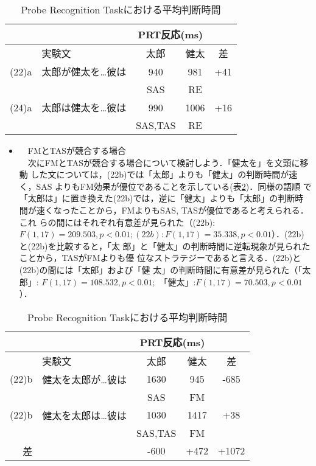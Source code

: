 \begin{table}
\begin{center}
\caption{Probe Recognition Taskにおける平均判断時間}
\label{table:ptr}
\begin{tabular}{|r|l|c|c|c|} \hline
    \multicolumn{2}{|c|}{} & \multicolumn{2}{c|}{PRT反応(ms)} &   \\ \hline
      & 実験文 & 太郎 & 健太 & 差 \\ \hline
(22)a & 太郎が健太を\ldots 彼は & 940 &  981	& +41 \\
      &                    & SAS & RE   & \\ \hline
(24)a & 太郎は健太を\ldots 彼は & 990 & 1006	& +16 \\
      &                    & SAS,TAS & RE & \\ \hline
\end{tabular}
\end{center}
\end{table}

\begin{itemize}
  \item　FMとTASが競合する場合\\
　次にFMとTASが競合する場合について検討しよう．「健太を」を文頭に移動
した文については，(22b)では「太郎」よりも「健太」の判断時間が速く，SAS
よりもFM効果が優位であることを示している(表\ref{table:fmtas})．同様の語順
で「太郎は」に置き換えた(22b)では，逆に「健太」よりも「太郎」の判断時
間が速くなったことから，FMよりもSAS, TASが優位であると考えられる．これ
らの間にはそれぞれ有意差が見られた（(22b): $F(1,17)=209.503,
p<0.01;(22b):F(1,17)=35.338,p<0.01$）．(22b)と(22b)を比較すると，「太
郎」と「健太」の判断時間に逆転現象が見られたことから，TASがFMよりも優
位なストラテジーであると言える．(22b)と(22b)の間には「太郎」および「健
太」の判断時間に有意差が見られた（「太郎」: $F(1,17)=108.532, p<0.01;$ 
「健太」:$F(1,17)=70.503,p<0.01$）．
\end{itemize}

\begin{table}
\vspace{-5mm}
\begin{center}
\caption{Probe Recognition Taskにおける平均判断時間}
\label{table:fmtas}
\begin{tabular}{|r|l|c|c|c|} \hline
    \multicolumn{2}{|c|}{} & \multicolumn{2}{c|}{PRT反応(ms)} &   \\ \hline
      & 実験文 & 太郎 & 健太 & 差 \\ \hline
(22)b & 健太を太郎が\ldots 彼は & 1630 & 945& -685 \\
      &                    & SAS & FM & \\ \hline
(22)b & 健太を太郎は\ldots 彼は & 1030 & 1417 & +38 \\
      &                    & SAS,TAS & FM & \\ \hline
  差  &                    & -600 & +472 & +1072 \\ \hline
\end{tabular}
\end{center}
\end{table}

